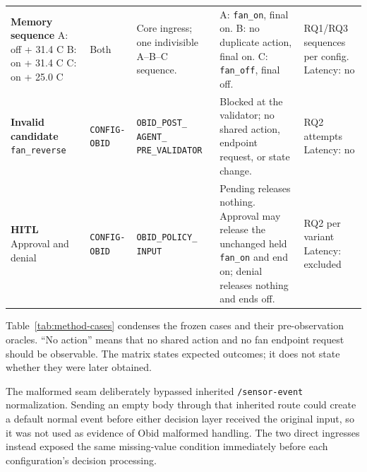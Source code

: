 \begin{table}[H]
\begin{tabularx}{\textwidth}{
  @{}
  L{0.18\textwidth}
  L{0.105\textwidth}
  L{0.215\textwidth}
  Y
  L{0.145\textwidth}
  @{}
}
\textbf{Memory sequence}\newline
A: off + 31.4 C\newline
B: on + 31.4 C\newline
C: on + 25.0 C
&
Both
&
Core ingress; one indivisible A--B--C sequence.
&
A: \texttt{fan\_on}, final on.\newline
B: no duplicate action, final on.\newline
C: \texttt{fan\_off}, final off.
&
RQ1/RQ3 sequences per config.\newline
Latency: no
\\
\addlinespace[1.5pt]

\textbf{Invalid candidate}\newline
\texttt{fan\_reverse}
&
\texttt{CONFIG-}\newline
\texttt{OBID}
&
\texttt{OBID\_POST\_}\newline
\texttt{AGENT\_}\newline
\texttt{PRE\_VALIDATOR}
&
Blocked at the validator; no shared action, endpoint request, or state
change.
&
RQ2 attempts\newline
Latency: no
\\
\addlinespace[1.5pt]

\textbf{HITL}\newline
Approval and denial
&
\texttt{CONFIG-}\newline
\texttt{OBID}
&
\texttt{OBID\_POLICY\_}\newline
\texttt{INPUT}
&
Pending releases nothing. Approval may release the unchanged held
\texttt{fan\_on} and end on; denial releases nothing and ends off.
&
RQ2 per variant\newline
Latency: excluded
\\

\bottomrule
\end{tabularx}
\endgroup
\end{table}

Table~\ref{tab:method-cases} condenses the frozen cases and their
pre-observation oracles. ``No action'' means that no shared action and no fan
endpoint request should be observable. The matrix states expected outcomes;
it does not state whether they were later obtained.

The malformed seam deliberately bypassed inherited \texttt{/sensor-event}
normalization. Sending an empty body through that inherited route could create
a default normal event before either decision layer received the original
input, so it was not used as evidence of Obid malformed handling. The two
direct ingresses instead exposed the same missing-value condition immediately
before each configuration's decision processing.

